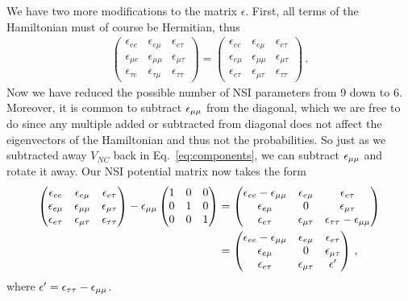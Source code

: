 \documentclass[draft=True]{thesis}
\begin{document}
We have two more modifications to the matrix $\epsilon$. First, all terms of the Hamiltonian must of course be Hermitian, thus
\begin{align}
    \begin{pmatrix}
        \epsilon_{ee} & \epsilon_{e\mu} & \epsilon_{e\tau}  \\
        \epsilon_{\mu e} & \epsilon_{\mu\mu} & \epsilon_{\mu\tau}  \\
        \epsilon_{\tau e} & \epsilon_{\tau\mu} & \epsilon_{\tau\tau}
    \end{pmatrix} =
    \begin{pmatrix}
        \epsilon_{ee} & \epsilon_{e\mu} & \epsilon_{e\tau}  \\
        \epsilon_{e \mu} & \epsilon_{\mu\mu} & \epsilon_{\mu\tau}  \\
        \epsilon_{e\tau} & \epsilon_{\mu\tau} & \epsilon_{\tau\tau}
    \end{pmatrix}\,.
\end{align}
Now we have reduced the possible number of NSI parameters from 9 down to 6. Moreover, it is common to subtract $\epsilon_{\mu\mu}$ from the diagonal, which
we are free to do since any multiple added or subtracted from diagonal does not affect the eigenvectors of the Hamiltonian and thus not the
probabilities. So just as we subtracted away $V_{NC}$ back in Eq.~\ref{eq:components}, we can subtract $\epsilon_{\mu\mu}$ and rotate it away.
Our NSI potential matrix now takes the form 
\begin{align}
    \begin{pmatrix}
        \epsilon_{ee} & \epsilon_{e\mu} & \epsilon_{e\tau}  \\
        \epsilon_{e \mu} & \epsilon_{\mu\mu} & \epsilon_{\mu\tau}  \\
        \epsilon_{e\tau} & \epsilon_{\mu\tau} & \epsilon_{\tau\tau}
    \end{pmatrix} 
    - \epsilon_{\mu\mu}
    \begin{pmatrix}
        1 & 0 & 0 \\
        0 & 1 & 0 \\
        0 & 0 & 1 
    \end{pmatrix}
     &= \begin{pmatrix}
        \epsilon_{ee}- \epsilon_{\mu\mu} & \epsilon_{e\mu} & \epsilon_{e\tau}  \\
        \epsilon_{e \mu} & 0 & \epsilon_{\mu\tau}  \\
        \epsilon_{e\tau} & \epsilon_{\mu\tau} & \epsilon_{\tau\tau} - \epsilon_{\mu\mu}
    \end{pmatrix} \nonumber \\
    &= \begin{pmatrix}
        \epsilon_{ee}- \epsilon_{\mu\mu} & \epsilon_{e\mu} & \epsilon_{e\tau}  \\
        \epsilon_{e \mu} & 0 & \epsilon_{\mu\tau}  \\
        \epsilon_{e\tau} & \epsilon_{\mu\tau} & \epsilon^\prime
    \end{pmatrix}\,,
\end{align}
where $\epsilon^\prime = \epsilon_{\tau\tau} - \epsilon_{\mu\mu}$.
\end{document}
